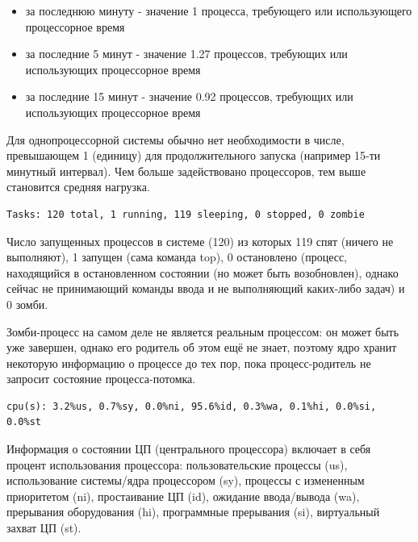 \documentclass[10pt]{book}
\begin{document}
\begin{itemize}
\item за последнюю минуту - значение 1 процесса, требующего или использующего процессорное время
\item за последние 5 минут - значение 1.27 процессов, требующих или использующих процессорное время
\item за последние 15 минут - значение 0.92 процессов, требующих или использующих процессорное время
\end{itemize}

Для однопроцессорной системы обычно нет необходимости в числе, превышающем 1 (единицу) для продолжительного запуска (например 15-ти минутный интервал). Чем больше задействовано процессоров, тем выше становится средняя нагрузка.

\vspace{3mm}
\begin{tcolorbox}
\begin{lstlisting}
Tasks: 120 total, 1 running, 119 sleeping, 0 stopped, 0 zombie
\end{lstlisting}
\end{tcolorbox}

Число запущенных процессов в системе (120) из которых 119 спят (ничего не выполняют), 1 запущен (сама команда top), 0 остановлено (процесс, находящийся в остановленном состоянии (но может быть возобновлен), однако сейчас не принимающий команды ввода и не выполняющий каких-либо задач) и 0 зомби.

Зомби-процесс на самом деле не является реальным процессом: он может быть уже завершен, однако его родитель об этом ещё не знает, поэтому ядро хранит некоторую информацию о процессе до тех пор, пока процесс-родитель не запросит состояние процесса-потомка. 

\vspace{3mm}
\begin{tcolorbox}
\begin{lstlisting}
сpu(s): 3.2%us, 0.7%sy, 0.0%ni, 95.6%id, 0.3%wa, 0.1%hi, 0.0%si, 0.0%st
\end{lstlisting}
\end{tcolorbox}

Информация о состоянии ЦП (центрального процессора) включает в себя процент использования процессора: пользовательские процессы (us), использование системы/ядра процессором (sy), процессы с измененным приоритетом (ni), простаивание ЦП (id), ожидание ввода/вывода (wa), прерывания оборудования (hi), программные прерывания (si), виртуальный захват ЦП (st).
\end{document}
